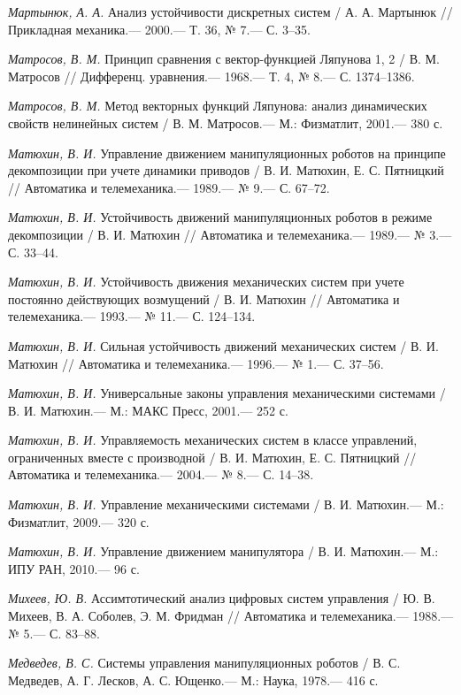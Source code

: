\begin{thebibliography}{10}
	
	{\it Мартынюк, А. А.} Анализ устойчивости дискретных систем / А. А. Мартынюк
	// Прикладная механика.— 2000.— Т. 36, № 7.— С. 3–35.
	
	{\it Матросов, В. М.} Принцип сравнения с вектор-функцией Ляпунова 1, 2 / В. М. Матросов
	// Дифференц. уравнения.— 1968.— Т. 4, № 8.— С. 1374–1386.
	
	{\it Матросов, В. М.} Метод векторных функций Ляпунова: анализ динамических свойств нелинейных систем / В. М. Матросов.— М.: Физматлит, 2001.— 380 с.
	
	{\it Матюхин, В. И.} Управление движением манипуляционных роботов на принципе декомпозиции при учете динамики приводов
	/ В. И. Матюхин, Е. С. Пятницкий // Автоматика и телемеханика.— 1989.— № 9.— С. 67–72.
	
	{\it Матюхин, В. И.} Устойчивость движений манипуляционных роботов в режиме декомпозиции
	/ В. И. Матюхин // Автоматика и телемеханика.— 1989.— № 3.— С. 33–44.
	
	{\it Матюхин, В. И.} Устойчивость движения механических систем при учете постоянно действующих возмущений
	/ В. И. Матюхин // Автоматика и телемеханика.— 1993.— № 11.— С. 124–134.
	
	{\it Матюхин, В. И.} Сильная устойчивость движений механических систем
	/ В. И. Матюхин // Автоматика и телемеханика.— 1996.— № 1.— С. 37–56.
	
	{\it Матюхин, В. И.} Универсальные законы управления механическими системами /
	В. И. Матюхин.— М.: МАКС Пресс, 2001.— 252 с.
	
	{\it Матюхин, В. И.} Управляемость механических систем в классе управлений, ограниченных вместе с производной
	/ В. И. Матюхин, Е. С. Пятницкий // Автоматика и телемеханика.— 2004.— № 8.— С. 14–38.
	
	{\it Матюхин, В. И.} Управление механическими системами / В. И. Матюхин.— М.: Физматлит,
	2009.— 320 с.
	
	{\it Матюхин, В. И.} Управление движением манипулятора / В. И. Матюхин.— М.: ИПУ
	РАН, 2010.— 96 с.
	
	{\it Михеев, Ю. В.} Ассимтотический анализ цифровых систем управления / Ю. В. Михеев, В. А. Соболев, Э. М. Фридман // Автоматика и телемеханика.— 1988.— № 5.— С. 83–88.
	
	{\it Медведев, В. С.} Системы управления манипуляционных роботов / В. С. Медведев,
	А. Г. Лесков, А. С. Ющенко.— М.: Наука, 1978.— 416 с.
	

\end{thebibliography}
